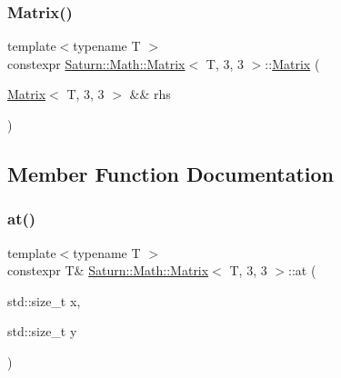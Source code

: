 \subsubsection{\texorpdfstring{Matrix()}{Matrix()}\hspace{0.1cm}{\footnotesize\ttfamily [4/4]}}
{\footnotesize\ttfamily template$<$typename T $>$ \\
constexpr \mbox{\hyperlink{class_saturn_1_1_math_1_1_matrix}{Saturn\+::\+Math\+::\+Matrix}}$<$ T, 3, 3 $>$\+::\mbox{\hyperlink{class_saturn_1_1_math_1_1_matrix}{Matrix}} (\begin{DoxyParamCaption}\item[{\mbox{\hyperlink{class_saturn_1_1_math_1_1_matrix}{Matrix}}$<$ T, 3, 3 $>$ \&\&}]{rhs }\end{DoxyParamCaption})\hspace{0.3cm}{\ttfamily [inline]}}



\subsection{Member Function Documentation}
\mbox{\label{class_saturn_1_1_math_1_1_matrix_3_01_t_00_013_00_013_01_4_a953bb9dda39f489340751274aed5ca34}} 
\subsubsection{\texorpdfstring{at()}{at()}\hspace{0.1cm}{\footnotesize\ttfamily [1/2]}}
{\footnotesize\ttfamily template$<$typename T $>$ \\
constexpr T\& \mbox{\hyperlink{class_saturn_1_1_math_1_1_matrix}{Saturn\+::\+Math\+::\+Matrix}}$<$ T, 3, 3 $>$\+::at (\begin{DoxyParamCaption}\item[{std\+::size\+\_\+t}]{x,  }\item[{std\+::size\+\_\+t}]{y }\end{DoxyParamCaption})\hspace{0.3cm}{\ttfamily [inline]}}

\mbox{\label{class_saturn_1_1_math_1_1_matrix_3_01_t_00_013_00_013_01_4_aafa4cc31f61f9086334b0683a1d87254}} 
